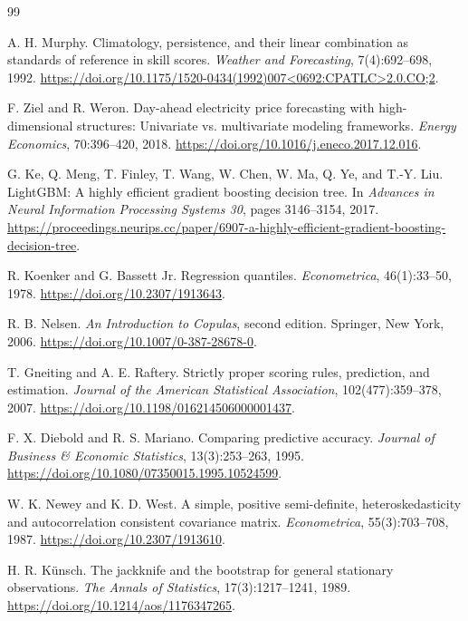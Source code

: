 \documentclass[11pt,a4paper]{article}
\begin{document}
\begin{thebibliography}{99}

A. H. Murphy.
\newblock Climatology, persistence, and their linear combination as standards
of reference in skill scores.
\newblock \emph{Weather and Forecasting}, 7(4):692--698, 1992.
\newblock \url{https://doi.org/10.1175/1520-0434(1992)007<0692:CPATLC>2.0.CO;2}.

F. Ziel and R. Weron.
\newblock Day-ahead electricity price forecasting with high-dimensional
structures: Univariate vs. multivariate modeling frameworks.
\newblock \emph{Energy Economics}, 70:396--420, 2018.
\newblock \url{https://doi.org/10.1016/j.eneco.2017.12.016}.

G. Ke, Q. Meng, T. Finley, T. Wang, W. Chen, W. Ma, Q. Ye, and T.-Y. Liu.
\newblock LightGBM: A highly efficient gradient boosting decision tree.
\newblock In \emph{Advances in Neural Information Processing Systems 30},
pages 3146--3154, 2017.
\newblock \url{https://proceedings.neurips.cc/paper/6907-a-highly-efficient-gradient-boosting-decision-tree}.

R. Koenker and G. Bassett Jr.
\newblock Regression quantiles.
\newblock \emph{Econometrica}, 46(1):33--50, 1978.
\newblock \url{https://doi.org/10.2307/1913643}.

R. B. Nelsen.
\newblock \emph{An Introduction to Copulas}, second edition.
\newblock Springer, New York, 2006.
\newblock \url{https://doi.org/10.1007/0-387-28678-0}.

T. Gneiting and A. E. Raftery.
\newblock Strictly proper scoring rules, prediction, and estimation.
\newblock \emph{Journal of the American Statistical Association},
102(477):359--378, 2007.
\newblock \url{https://doi.org/10.1198/016214506000001437}.

F. X. Diebold and R. S. Mariano.
\newblock Comparing predictive accuracy.
\newblock \emph{Journal of Business \& Economic Statistics}, 13(3):253--263,
1995.
\newblock \url{https://doi.org/10.1080/07350015.1995.10524599}.

W. K. Newey and K. D. West.
\newblock A simple, positive semi-definite, heteroskedasticity and
autocorrelation consistent covariance matrix.
\newblock \emph{Econometrica}, 55(3):703--708, 1987.
\newblock \url{https://doi.org/10.2307/1913610}.

H. R. K\"unsch.
\newblock The jackknife and the bootstrap for general stationary observations.
\newblock \emph{The Annals of Statistics}, 17(3):1217--1241, 1989.
\newblock \url{https://doi.org/10.1214/aos/1176347265}.


\end{thebibliography}
\end{document}
